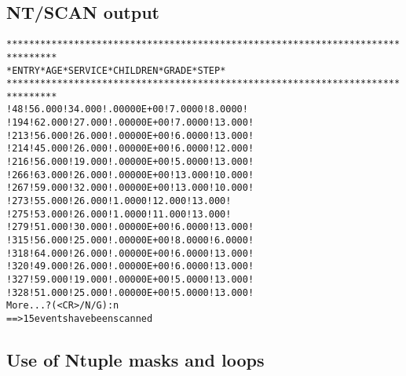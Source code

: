 \subsection*{NT/SCAN output}
\begin{alltt}
 *******************************************************************************
 * ENTRY *   AGE       *   SERVICE   *   CHILDREN  *   GRADE     *   STEP      *
 *******************************************************************************
 !    48 !   56.000    !   34.000    !   .00000E+00!   7.0000    !   8.0000    !
 !   194 !   62.000    !   27.000    !   .00000E+00!   7.0000    !   13.000    !
 !   213 !   56.000    !   26.000    !   .00000E+00!   6.0000    !   13.000    !
 !   214 !   45.000    !   26.000    !   .00000E+00!   6.0000    !   12.000    !
 !   216 !   56.000    !   19.000    !   .00000E+00!   5.0000    !   13.000    !
 !   266 !   63.000    !   26.000    !   .00000E+00!   13.000    !   10.000    !
 !   267 !   59.000    !   32.000    !   .00000E+00!   13.000    !   10.000    !
 !   273 !   55.000    !   26.000    !   1.0000    !   12.000    !   13.000    !
 !   275 !   53.000    !   26.000    !   1.0000    !   11.000    !   13.000    !
 !   279 !   51.000    !   30.000    !   .00000E+00!   6.0000    !   13.000    !
 !   315 !   56.000    !   25.000    !   .00000E+00!   8.0000    !   6.0000    !
 !   318 !   64.000    !   26.000    !   .00000E+00!   6.0000    !   13.000    !
 !   320 !   49.000    !   26.000    !   .00000E+00!   6.0000    !   13.000    !
 !   327 !   59.000    !   19.000    !   .00000E+00!   5.0000    !   13.000    !
 !   328 !   51.000    !   25.000    !   .00000E+00!   5.0000    !   13.000    !
 More...? ( <CR>/N/G ): n
 ==>     15 events have been scanned
\end{alltt}
\clearpage
\mbox{}

\clearpage

\subsection{Use of Ntuple masks and loops}


